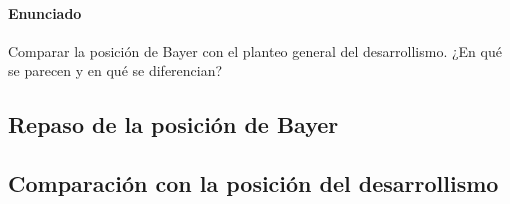 \paragraph{Enunciado}
 Comparar la posición de Bayer con el planteo general del desarrollismo. ¿En qué se parecen y en qué se diferencian?

 \subsection*{Repaso de la posición de Bayer}

 \subsection*{Comparación con la posición del desarrollismo}
